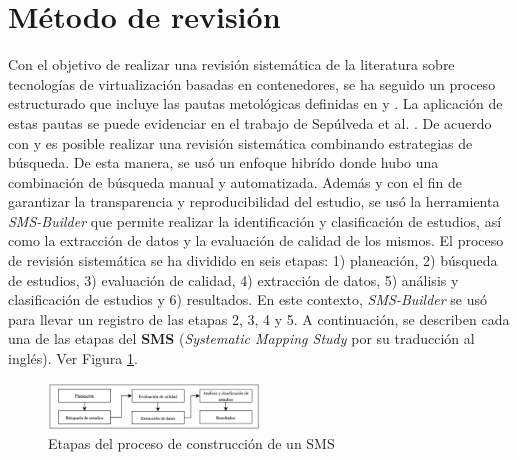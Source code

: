 \section{Método de revisión}
Con el objetivo de realizar una revisión sistemática de la literatura sobre tecnologías de virtualización basadas en contenedores, se ha seguido un proceso estructurado que incluye las pautas metológicas definidas en \cite{Runeson2009} y \cite{Kitchenham2010}.
La aplicación de estas pautas se puede evidenciar en el trabajo de Sepúlveda et al. \cite{Sepulveda-Rodriguez2021}. De acuerdo con \cite{Mourao2017} y \cite{Nguyen2015} es posible realizar una revisión sistemática combinando estrategias de búsqueda. De esta manera, se usó un enfoque hibrído donde hubo una combinación de búsqueda manual y automatizada. 
Además y con el fin de garantizar la transparencia y reproducibilidad del estudio, se usó la herramienta \textit{SMS-Builder} \cite{Candela-Uribe2022} que permite realizar la identificación y clasificación de estudios, así como la extracción de datos y la evaluación de calidad de los mismos.
El proceso de revisión sistemática se ha dividido en seis etapas: 1) planeación, 2) búsqueda de estudios, 3) evaluación de calidad, 4) extracción de datos, 5) análisis y clasificación de estudios y 6) resultados. En este contexto, \textit{SMS-Builder} se usó para llevar un registro de las etapas 2, 3, 4 y 5. A continuación, se describen cada una de las etapas del \textbf{SMS} (\textit{Systematic Mapping Study} por su traducción al inglés). Ver Figura \ref{fig:etapas}.

\begin{figure}[htbp]
    \centering
    \includegraphics[width=0.5\textwidth]{resources/images/planeacion/planeacion.png}
    \caption{Etapas del proceso de construcción de un SMS}\label{fig:etapas}
\end{figure}












